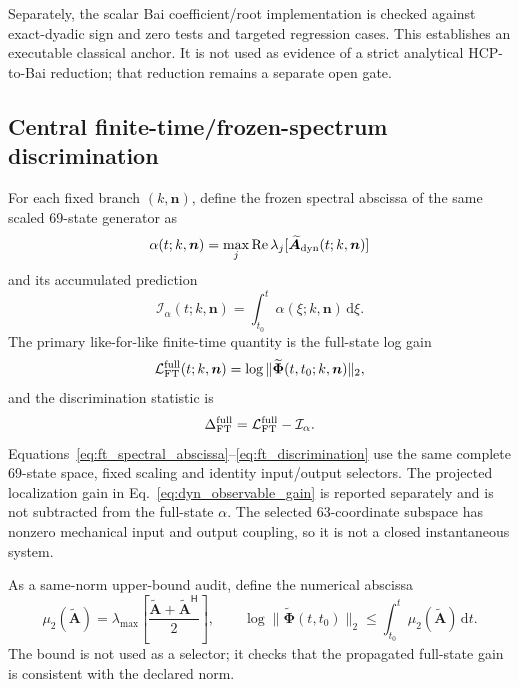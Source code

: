 Separately, the scalar Bai coefficient/root implementation is checked against exact-dyadic sign and zero tests and targeted regression cases. This establishes an executable classical anchor. It is not used as evidence of a strict analytical HCP-to-Bai reduction; that reduction remains a separate open gate.

\subsection{Central finite-time/frozen-spectrum discrimination}

For each fixed branch $(k,\boldsymbol n)$, define the frozen spectral abscissa of the same scaled 69-state generator as
\begin{equation}
 \alpha(t;k,\boldsymbol n)
 =\max_j\operatorname{Re}\lambda_j
 [\widetilde{\boldsymbol A}_{\rm dyn}(t;k,\boldsymbol n)]
 \label{eq:ft_spectral_abscissa}
\end{equation}
and its accumulated prediction
\begin{equation}
 \mathcal I_\alpha(t;k,\boldsymbol n)
 =\int_{t_0}^{t}\alpha(\xi;k,\boldsymbol n)\,\mathrm d\xi .
 \label{eq:ft_frozen_integral}
\end{equation}
The primary like-for-like finite-time quantity is the full-state log gain
\begin{equation}
 \mathcal L_{\rm FT}^{\rm full}(t;k,\boldsymbol n)
 =\log\|\widetilde{\boldsymbol\Phi}
 (t,t_0;k,\boldsymbol n)\|_2,
 \label{eq:ft_log_gain}
\end{equation}
and the discrimination statistic is
\begin{equation}
 \Delta_{\rm FT}^{\rm full}
 =\mathcal L_{\rm FT}^{\rm full}-\mathcal I_\alpha .
 \label{eq:ft_discrimination}
\end{equation}
Equations~\eqref{eq:ft_spectral_abscissa}--\eqref{eq:ft_discrimination}
use the same complete 69-state space, fixed scaling and identity input/output
selectors. The projected localization gain in
Eq.~\eqref{eq:dyn_observable_gain} is reported separately and is not
subtracted from the full-state $\alpha$. The selected 63-coordinate subspace
has nonzero mechanical input and output coupling, so it is not a closed
instantaneous system.

As a same-norm upper-bound audit, define the numerical abscissa
\begin{equation}
 \mu_2(\widetilde{\boldsymbol A})
 =\lambda_{\max}\!\left[
 \frac{\widetilde{\boldsymbol A}
 +\widetilde{\boldsymbol A}^{\mathsf H}}{2}\right],
 \qquad
 \log\|\widetilde{\boldsymbol\Phi}(t,t_0)\|_2
 \le\int_{t_0}^{t}\mu_2(\widetilde{\boldsymbol A})\,\mathrm dt .
 \label{eq:ft_logarithmic_norm_bound}
\end{equation}
The bound is not used as a selector; it checks that the propagated full-state
gain is consistent with the declared norm.


